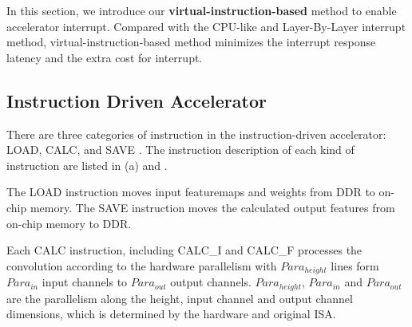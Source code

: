 \label{sec:cnninterrupt}





In this section, we introduce our \textbf{virtual-instruction-based} method to enable accelerator interrupt. Compared with the CPU-like and Layer-By-Layer interrupt method, virtual-instruction-based method minimizes the interrupt response latency and the extra cost for interrupt.

\subsection{ Instruction Driven Accelerator }

There are three categories of instruction in the instruction-driven accelerator: LOAD, CALC, and SAVE \cite{guo2017angel}. The instruction description of each kind of instruction are listed in (a) and .

The LOAD instruction moves input featuremaps and weights from DDR to on-chip memory. The SAVE instruction moves the calculated output features from on-chip memory to DDR. 

Each CALC  instruction,  including CALC\_I and CALC\_F processes the convolution according to the hardware parallelism with $Para_{height}$ lines form $ Para_{in} $ input channels to $ Para_{out}$ output channels. $Para_{height}$, $ Para_{in} $ and $ Para_{out} $ are the parallelism along the height, input channel and output channel dimensions, which is determined by the hardware and original ISA.

